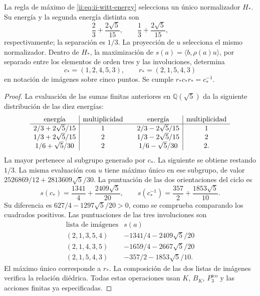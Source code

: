 \begin{proposition}
\label{ii:prop:ii-witt-variational-selection}
La regla de máximo de \eqref{ii:eq:ii-witt-energy} selecciona un único
normalizador \(H_*\). Su energía y la segunda energía distinta son
\[
 \frac23+\frac{2\sqrt5}{15},\qquad
 \frac13+\frac{2\sqrt5}{15},
\]
respectivamente; la separación es \(1/3\). La proyección de \(u\)
selecciona el mismo normalizador. Dentro de \(H_*\), la maximización de
\(s(a)=\langle b,\rho(a)u\rangle\), por separado entre los elementos
de orden tres y las involuciones, determina
\[
 c_*=(1,2,4,5,3),\qquad r_*=(2,1,5,4,3)
\]
en notación de imágenes sobre cinco puntos. Se cumple
\(r_*c_*r_*=c_*^{-1}\).
\end{proposition}
\begin{proof}
La evaluación de las sumas finitas anteriores en \(\mathbb Q(\sqrt5)\)
da la siguiente distribución de las diez energías:
\[
\begin{array}{c|c@{\qquad}c|c}
\text{energía}&\text{multiplicidad}&\text{energía}&\text{multiplicidad}\\ \hline
2/3+2\sqrt5/15&1&2/3-2\sqrt5/15&1\\
1/3+2\sqrt5/15&2&1/3-2\sqrt5/15&2\\
1/6+\sqrt5/30&2&1/6-\sqrt5/30&2.
\end{array}
\]
La mayor pertenece al subgrupo generado por \(c_*\). La siguiente se
obtiene restando \(1/3\). La misma evaluación con \(u\) tiene máximo
único en ese subgrupo, de valor
\(2526869/12+2813609\sqrt5/30\).
La puntuación de las dos orientaciones del ciclo es
\[
 s(c_*)=\frac{1341}{4}+\frac{2409\sqrt5}{20},\qquad
 s(c_*^{-1})=\frac{357}{2}+\frac{1853\sqrt5}{10}.
\]
Su diferencia es \(627/4-1297\sqrt5/20>0\), como se comprueba
comparando los cuadrados positivos. Las puntuaciones de las tres
involuciones son
\[
\begin{array}{c|c}
\text{lista de imágenes}&s(a)\\ \hline
(2,1,3,5,4)&-1341/4-2409\sqrt5/20\\
(2,1,4,3,5)&-1659/4-2667\sqrt5/20\\
(2,1,5,4,3)&-357/2-1853\sqrt5/10.
\end{array}
\]
El máximo único corresponde a \(r_*\). La composición de las dos listas de
imágenes verifica la relación diédrica. Todas estas operaciones usan
\(K\), \(B_K\), \(P_3^{\mathrm{ico}}\) y las acciones finitas ya especificadas.
\end{proof}


